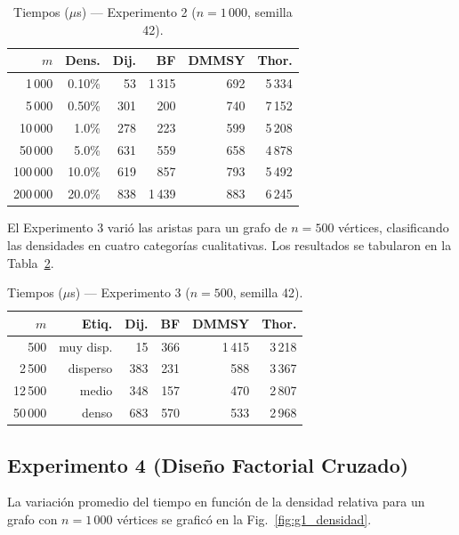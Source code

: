 \documentclass[conference]{IEEEtran}
\begin{document}
\begin{table}[H]
  \centering
  \caption{Tiempos ($\mu$s) — Experimento 2 ($n=1\,000$, semilla 42).}
  \label{tab:exp2_data}
  \scriptsize
  \begin{tabular}{rrrrrr}
    \toprule
    $m$ & \textbf{Dens.} &
    \textbf{Dij.} & \textbf{BF} & \textbf{DMMSY} & \textbf{Thor.} \\
    \midrule
    1\,000   & 0.10\% & 53  & 1\,315 & 692 & 5\,334 \\
    5\,000   & 0.50\% & 301 & 200    & 740 & 7\,152 \\
    10\,000  & 1.0\%  & 278 & 223    & 599 & 5\,208 \\
    50\,000  & 5.0\%  & 631 & 559    & 658 & 4\,878 \\
    100\,000 & 10.0\% & 619 & 857    & 793 & 5\,492 \\
    200\,000 & 20.0\% & 838 & 1\,439 & 883 & 6\,245 \\
    \bottomrule
  \end{tabular}
\end{table}

El Experimento 3 varió las aristas para un grafo de $n=500$ vértices, clasificando las densidades en cuatro categorías cualitativas. Los resultados se tabularon en la Tabla~\ref{tab:exp3_data}.

\begin{table}[H]
  \centering
  \caption{Tiempos ($\mu$s) — Experimento 3 ($n=500$, semilla 42).}
  \label{tab:exp3_data}
  \scriptsize
  \begin{tabular}{rrrrrr}
    \toprule
    $m$ & \textbf{Etiq.} &
    \textbf{Dij.} & \textbf{BF} & \textbf{DMMSY} & \textbf{Thor.} \\
    \midrule
    500     & muy disp. & 15  & 366 & 1\,415 & 3\,218 \\
    2\,500  & disperso     & 383 & 231 & 588    & 3\,367 \\
    12\,500 & medio        & 348 & 157 & 470    & 2\,807 \\
    50\,000 & denso        & 683 & 570 & 533    & 2\,968 \\
    \bottomrule
  \end{tabular}
\end{table}

\subsection{Experimento 4 (Diseño Factorial Cruzado)}

La variación promedio del tiempo en función de la densidad relativa para un grafo con $n=1\,000$ vértices se graficó en la Fig.~\ref{fig:g1_densidad}.
\end{document}
